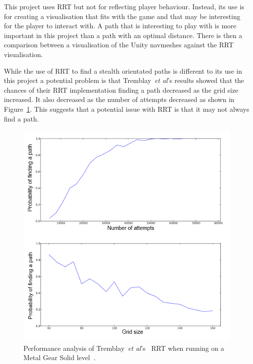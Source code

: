 \documentclass[journal]{IEEEtran}
\begin{document}
	This project uses RRT but not for reflecting player behaviour.  Instead, its use is for creating a visualisation that fits with the game and that may be interesting for the player to interact with. A path that is interesting to play with is more important in this project than a path with an optimal distance. There is then a comparison between a visualisation of the Unity navmeshes against the RRT visualisation.
	
	While the use of RRT to find a stealth orientated paths is different to its use in this project a potential problem is that Tremblay~\textit{et al}'s results showed that the chances of their RRT implementation finding a path decreased as the grid size increased. It also decreased as the number of attempts decreased as shown in Figure~\ref{TremblayRRT}.  This suggests that a potential issue with RRT is that it may not always find a path.
	
	\begin{figure}[h]
		\includegraphics[width=1.0\linewidth]{Tremblay2013.png}
		\caption{ Performance analysis of Tremblay~\textit{et al}'s~\cite{Tremblay2013} RRT when running on a Metal Gear Solid level~\cite{game:MetalGearSolid}.}
		\label{TremblayRRT}
	\end{figure} 
	
\end{document}
